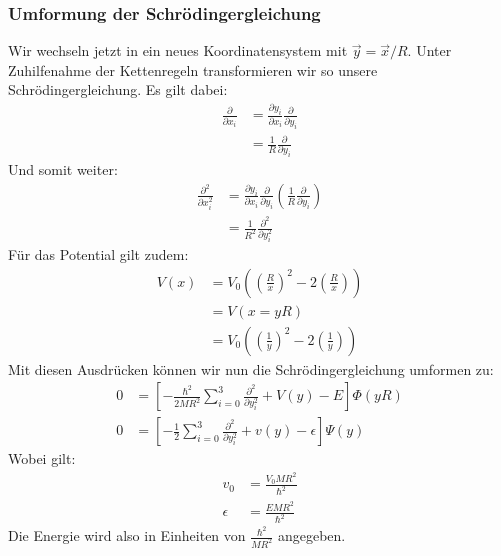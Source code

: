 \documentclass[11pt,a4paper]{article}
\begin{document}
\subsubsection*{Umformung der Schrödingergleichung}
Wir wechseln jetzt in ein neues Koordinatensystem mit $\vec{y} = \vec{x}/R$. Unter Zuhilfenahme der Kettenregeln transformieren wir so unsere Schrödingergleichung. Es gilt dabei:
\begin{align*}
	\frac{\partial}{\partial x_i} &= \frac{\partial y_i}{\partial x_i}\frac{\partial}{\partial y_i} \\
	&=\frac{1}{R}\frac{\partial}{\partial y_i}
\end{align*}
Und somit weiter:
\begin{align*}
	\frac{\partial^2}{\partial x_i^2} &= \frac{\partial y_i}{\partial x_i}\frac{\partial}{\partial y_i}\left(\frac{1}{R}\frac{\partial}{\partial y_i}\right) \\
	&= \frac{1}{R^2}\frac{\partial^2}{\partial y_i^2}
\end{align*}
Für das Potential gilt zudem:
\begin{align*}
	V(x) &= V_0\left(\left(\frac{R}{x}\right)^2 -2\left(\frac{R}{x}\right)\right) \\
	&= V(x=yR) \\
	&= V_0\left(\left(\frac{1}{y}\right)^2 -2\left(\frac{1}{y}\right)\right)
\end{align*}
Mit diesen Ausdrücken können wir nun die Schrödingergleichung umformen zu:
\begin{align}
	0 &= \left[-\frac{\hbar^2}{2MR^2}\sum_{i=0}^{3}\frac{\partial^2}{\partial y_i^2}+V(y) -E\right]\Phi(yR) \\
	0 &= \left[-\frac{1}{2}\sum_{i=0}^{3}\frac{\partial^2}{\partial y_i^2} + v(y) - \epsilon\right]\Psi(y)
\end{align}
Wobei gilt:
\begin{align*}
	v_0 &= \frac{V_0MR^2}{\hbar^2} \\
	\epsilon &= \frac{E MR^2}{\hbar^2}
\end{align*}
Die Energie wird also in Einheiten von $\frac{\hbar^2}{MR^2}$ angegeben.
\end{document}
